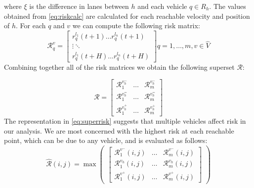 \documentclass[letterpaper, 10 pt, conference]{ieeeconf}  %
\newcommand\NB[1]{$\spadesuit$\footnote{NB: #1}}
\begin{document}
where $\xi$ is the difference in lanes between $h$ and each vehicle $q\in R_h$.
 The values obtained from \eqref{eq:riskcalc} are calculated for each reachable velocity and position of $h$. For each $q$ and $v$ we can compute the following risk matrix: %
\begin{equation} \label{eq:riskmat}
\mathcal{R}_{q}^{v}=
\begin{bmatrix}
r_q^{l_1}(t+1)  \dots  r_q^{l_n}(t+1) \\
\vdots  \ddots  \\
r_q^{l_1}(t+H)  \dots   r_q^{l_n}(t+H)
\end{bmatrix} q = 1,\ldots,m,v\in\hat{V}
\end{equation}
Combining together all of the risk matrices we obtain the following superset $\mathcal{R}$:

\begin{equation} \label{eq:superrisk}
\mathcal{R} =
\begin{bmatrix}
\mathcal{R}_{1}^{v_h^-} & \ldots & \mathcal{R}_{m}^{v_h^-} \\
\mathcal{R}_{1}^{v_h^=} & \ldots & \mathcal{R}_{m}^{v_h^=} \\
\mathcal{R}_{1}^{v_h^+} & \ldots   & \mathcal{R}_{m}^{v_h^+}
\end{bmatrix}
\end{equation}
The representation in \eqref{eq:superrisk} suggests that multiple vehicles affect risk in our analysis. We are most concerned with the highest risk at each reachable point, which can be due to any vehicle, and is evaluated as follows: %
\begin{equation} \label{eq:riskdistribution}
 \hat{\mathcal{R}}(i,j) = \max\begin{pmatrix}
 \begin{bmatrix}
\mathcal{R}_{1}^{v^-}(i,j) & \ldots & \mathcal{R}_{m}^{v^-}(i,j) \\
\mathcal{R}_{1}^{v_h}(i,j) & \ldots & \mathcal{R}_{m}^{v_h}(i,j) \\
\mathcal{R}_{1}^{v^+}(i,j) & \ldots   & \mathcal{R}_{m}^{v^+}(i,j)
\end{bmatrix}\end{pmatrix}
\end{equation}
\end{document}
